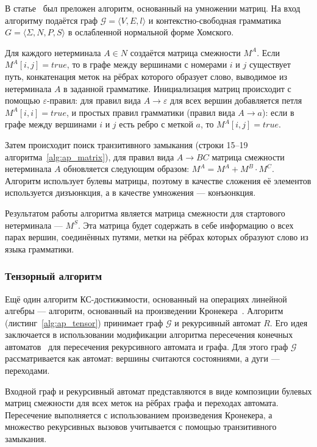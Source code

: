 В статье~\cite{rustam_algorithm} был преложен алгоритм, основанный на умножении матриц. На вход алгоритму подаётся граф $\mathcal{G}=\langle V,E,l \rangle$ и контекстно-свободная грамматика $G=\langle \Sigma, N, P, S\rangle$ в ослабленной нормальной форме Хомского.

Для каждого нетерминала $A \in N$ создаётся матрица смежности $M^A$. Если $M^A[i,j] = true$, то в графе между вершинами с номерами $i$ и $j$ существует путь, конкатенация меток на рёбрах которого образует слово, выводимое из нетерминала $A$ в заданной грамматике. Инициализация матриц происходит с помощью $\varepsilon$-правил: для правил вида $A \to \varepsilon$ для всех вершин добавляется петля $M^A[i,i] = true$, и простых правил грамматики (правил вида $A \to a$): если в графе между вершинами $i$ и $j$ есть ребро с меткой $a$, то $M^A[i,j] = true$.

Затем происходит поиск транзитивного замыкания (строки 15--19 алгоритма~\ref{alg:ap_matrix}), для правил вида $A \to BC$ матрица смежности нетерминала $A$ обновляется следующим образом: $M^A = M^A + M^B \cdot M^C$. Алгоритм использует булевы матрицы, поэтому в качестве сложения её элементов используется дизъюнкция, а в качестве умножения --- конъюнкция.

Результатом работы алгоритма является матрица смежности для стартового нетерминала --- $M^S$. Эта матрица будет содержать в себе информацию о всех парах вершин, соединённых путями, метки на рёбрах которых образуют слово из языка грамматики.


\subsubsection{Тензорный алгоритм}

Ещё один алгоритм КС-достижимости, основанный на операциях линейной алгебры --- алгоритм, основанный на произведении Кронекера~\cite{tensor_algorithm}. Алгоритм (листинг~\ref{alg:ap_tensor}) принимает граф $\mathcal{G}$ и рекурсивный автомат $R$. Его идея заключается в использовании модификации алгоритма пересечения конечных автоматов~\cite{automata_theory} для пересечения рекурсивного автомата и графа. Для этого граф $\mathcal{G}$ рассматривается как автомат: вершины считаются состояниями, а дуги --- переходами.

Входной граф и рекурсивный автомат представляются в виде композиции булевых матриц смежности для всех меток на рёбрах графа и переходах автомата. Пересечение выполняется с использованием произведения Кронекера, а множество рекурсивных вызовов учитывается с помощью транзитивного замыкания.

